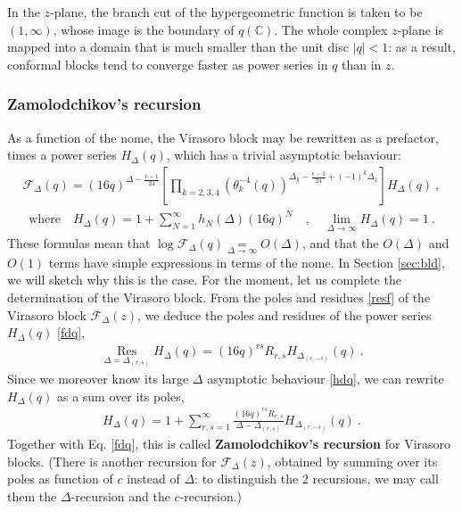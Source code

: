 \documentclass[12pt, a4paper]{article}
\newcommand{\myindex}[1]{\textbf{\boldmath #1}}
\begin{document}
In the $z$-plane, the branch cut of the hypergeometric function is taken to be $(1,\infty)$, whose image is the boundary of $q(\mathbb{C})$. The whole complex $z$-plane is mapped into a domain that is much smaller than the unit disc $|q|<1$: as a result, conformal blocks tend to converge faster as power series in $q$ than in $z$.
 
\subsubsection{Zamolodchikov's recursion}\label{sec:zrr}

As a function of the nome, the Virasoro block 
may be rewritten as a prefactor, times a power series $H_\Delta(q)$, which has a trivial asymptotic behaviour:
\begin{align}
 \boxed{\mathcal{F}_\Delta(q) = (16q)^{\Delta-\frac{c-1}{24}} \left[\prod_{k=2,3,4} \left(\theta_k^{-4}(q)\right)^{\Delta_k-\frac{c-1}{24}+(-1)^k \Delta_1} \right] H_\Delta(q)}\ ,
 \label{fdq}
\end{align}
\begin{align}
 \text{where} \quad \boxed{H_\Delta(q) = 1 + \sum_{N=1}^\infty h_N(\Delta)(16q)^N}  \quad , \quad \boxed{\lim_{\Delta\to\infty} H_\Delta(q) = 1}\ .
 \label{hdq}
\end{align}
These formulas mean that 
$\log \mathcal{F}_\Delta(q) \underset{\Delta\to\infty}{=} O(\Delta)$, and that the $O(\Delta)$ and $O(1)$ terms have simple expressions in terms of the nome. 
In Section \ref{sec:bld}, we will sketch why this is the case. For the moment, let us complete the determination of the Virasoro block.
From the poles and residues \eqref{resf} of the Virasoro block $\mathcal{F}_\Delta(z)$, we deduce the poles and residues of the power series $H_\Delta(q)$ \eqref{fdq},
\begin{align}
 \underset{\Delta=\Delta_{(r,s)}}{\operatorname{Res}} H_\Delta(q) = (16q)^{rs} R_{r,s}H_{\Delta_{(r,-s)}}(q)\ .
\end{align}
Since we moreover know its large $\Delta$ asymptotic behaviour \eqref{hdq}, we can rewrite $H_\Delta(q)$ as a sum over its poles,
\begin{align}
 \boxed{H_\Delta(q) = 1 + \sum_{r,s=1}^\infty \frac{(16q)^{rs} R_{r,s}}{\Delta-\Delta_{(r,s)}} H_{\Delta_{(r,-s)}}(q)}\ . 
 \label{hrec}
\end{align}
Together with Eq. \eqref{fdq}, this is called \myindex{Zamolodchikov's recursion} for Virasoro blocks. (There is another recursion for $\mathcal{F}_\Delta(z)$, obtained by summing over its poles as function of $c$ instead of $\Delta$: to distinguish the 2 recursions, we may call them the $\Delta$-recursion and the $c$-recursion.)
\end{document}
